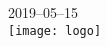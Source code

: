 \begin{titlepage}

{\large 2019--05--15}\\[1cm] %


\texttt{[image: logo]}\\[1cm] %


\vfill %

\end{titlepage}
